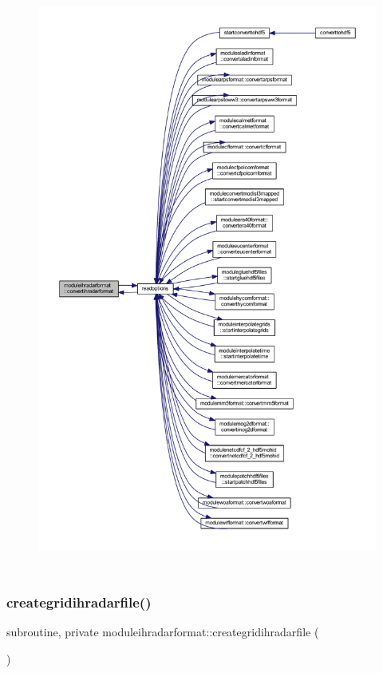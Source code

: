 \begin{figure}[H]
\begin{center}
\leavevmode
\includegraphics[height=550pt]{namespacemoduleihradarformat_a98ed94c78a186e13367d60ca010104fb_icgraph}
\end{center}
\end{figure}
\mbox{\label{namespacemoduleihradarformat_ada390827dfd90ffece67dfc0ddc1a1af}} 
\subsubsection{\texorpdfstring{creategridihradarfile()}{creategridihradarfile()}}
{\footnotesize\ttfamily subroutine, private moduleihradarformat\+::creategridihradarfile (\begin{DoxyParamCaption}{ }\end{DoxyParamCaption})\hspace{0.3cm}{\ttfamily [private]}}

